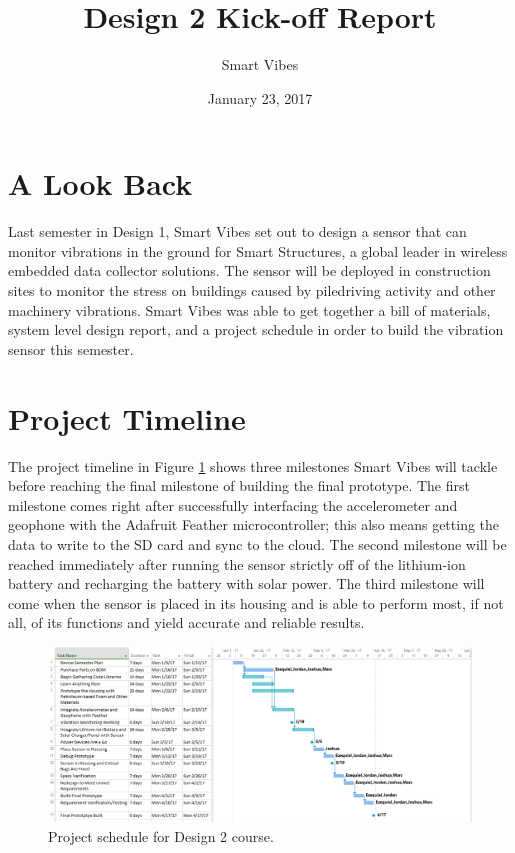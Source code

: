 \documentclass[12pt]{article}
\begin{document}
\title{Design 2 Kick-off Report}
\author{Smart Vibes}
\date{January 23, 2017}
\maketitle

\newpage
\tableofcontents

\newpage
\section{A Look Back}
Last semester in Design 1, Smart Vibes set out to design a sensor that can monitor vibrations in the ground for Smart Structures, a global leader in wireless embedded data collector solutions. The sensor will be deployed in construction sites to monitor the stress on buildings caused by piledriving activity and other machinery vibrations. Smart Vibes was able to get together a bill of materials, system level design report, and a project schedule in order to build the vibration sensor this semester.

\section{Project Timeline}
The project timeline in Figure \ref{fig:gantt_chart} shows three milestones Smart Vibes will tackle before reaching the final milestone of building the final prototype. The first milestone comes right after successfully interfacing the accelerometer and geophone with the Adafruit Feather microcontroller; this also means getting the data to write to the SD card and sync to the cloud. The second milestone will be reached immediately after running the sensor strictly off of the lithium-ion battery and recharging the battery with solar power. The third milestone will come when the sensor is placed in its housing and is able to perform most, if not all, of its functions and yield accurate and reliable results.

\begin{figure}[H]
    \centering
    \includegraphics[width=1.3\textwidth, angle=90]{src/gantt_chart.png}
    \caption{Project schedule for Design 2 course.}
    \label{fig:gantt_chart}
\end{figure}
\end{document}
